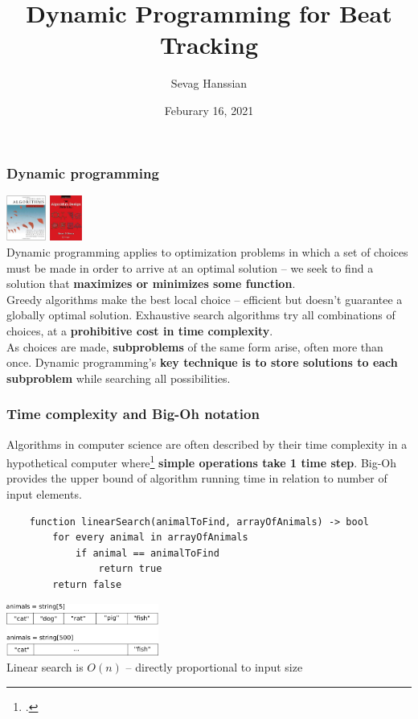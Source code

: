 \documentclass{beamer}
\title{Dynamic Programming for Beat Tracking}
\author{Sevag Hanssian}
\date{Feburary 16, 2021}
\institute{MUMT 621, Winter 2021}
\begin{document}
\begin{frame}
\maketitle
\end{frame}

\begin{frame}
	\frametitle{Dynamic programming}
	\vspace{0.5em}
	\includegraphics[height=1.5cm]{./clrs.jpg} \includegraphics[height=1.5cm]{./skiena.jpg}\\
	Dynamic programming applies to optimization problems in which a set of choices must be made in order to arrive at an optimal solution -- we seek to find a solution that \textbf{maximizes or minimizes some function}.\\
	\vspace{1em}
	Greedy algorithms make the best local choice -- efficient but doesn't guarantee a globally optimal solution. Exhaustive search algorithms try all combinations of choices, at a \textbf{prohibitive cost in time complexity}.\\
	\vspace{1em}
	As choices are made, \textbf{subproblems} of the same form arise, often more than once. Dynamic programming's \textbf{key technique is to store solutions to each subproblem} while searching all possibilities.
\end{frame}

\begin{frame}[fragile]
	\frametitle{Time complexity and Big-Oh notation}
	Algorithms in computer science are often described by their time complexity in a hypothetical computer where\footcite{skiena} \textbf{simple operations take 1 time step}. Big-Oh provides the upper bound of algorithm running time in relation to number of input elements.
	\begin{verbatim}
	function linearSearch(animalToFind, arrayOfAnimals) -> bool
	    for every animal in arrayOfAnimals
	        if animal == animalToFind
	            return true
	    return false
	\end{verbatim}
	\includegraphics[width=5cm]{./linearsearch.png}\\
	Linear search is $O(n)$ -- directly proportional to input size
\end{frame}
\end{document}
